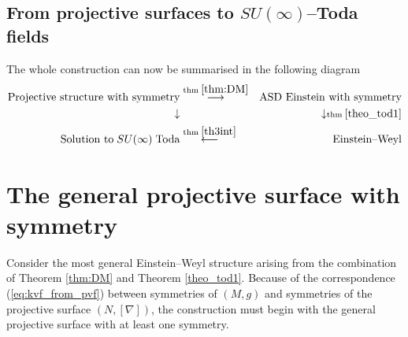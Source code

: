 
\subsection{From projective surfaces to $SU(\infty)$--Toda fields}
The whole construction can now be summarised in the following diagram
\begin{eqnarray}
\label{diagram}
\text{Projective structure with symmetry} &\overset{\text{thm}\;\ref{thm:DM}}
{\longrightarrow}& \text{ASD Einstein with symmetry}\nonumber\\
\downarrow & & \downarrow \scriptstyle{\text{thm}\;\ref{theo_tod1}}\\
\text{Solution to}\;SU(\infty)\; \text{Toda} &\overset{\text{thm}\;\ref{th3int}}\longleftarrow&\text{Einstein--Weyl}\nonumber
\end{eqnarray}

\section{The general projective surface with symmetry}
\label{general}

Consider the most general Einstein--Weyl structure arising from the combination
of Theorem \ref{thm:DM} and Theorem \ref{theo_tod1}. Because of the correspondence (\ref{eq:kvf_from_pvf}) between symmetries of $(M, g)$ and symmetries of the projective surface $(N, [\nabla])$, the construction must begin with the general projective surface with at least one symmetry. 
 
